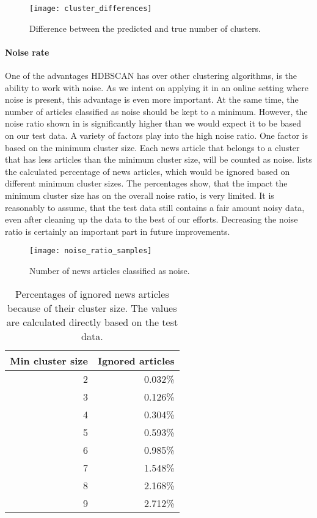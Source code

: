 \begin{figure}[h]
    \centering
    \texttt{[image: cluster\_differences]}
    \caption{Difference between the predicted and true number of clusters.}
    \label{fig:cluster_differences}
\end{figure}

\paragraph{Noise rate}
One of the advantages HDBSCAN has over other clustering algorithms,
is the ability to work with noise.
As we intent on applying it in an online setting where noise is present,
this advantage is even more important.
At the same time, the number of articles classified as noise should be kept to a minimum.
However, the noise ratio shown in  is significantly higher
than we would expect it to be based on our test data.
A variety of factors play into the high noise ratio.
One factor is based on the minimum cluster size.
Each news article that belongs to a cluster that has less articles than the minimum cluster size,
will be counted as noise.
 lists the calculated percentage of news articles,
which would be ignored based on different minimum cluster sizes.
The percentages show, that the impact the minimum cluster size has on the overall noise ratio, is very limited.
It is reasonably to assume, that the test data still contains a fair amount noisy data,
even after cleaning up the data to the best of our efforts.
Decreasing the noise ratio is certainly an important part in future improvements.

\begin{figure}[h]
    \centering
    \texttt{[image: noise\_ratio\_samples]}
    \caption{Number of news articles classified as noise.}
    \label{fig:noise_ratio_samples}
\end{figure}

\begin{table}[h]
    \centering
    \begin{tabular}{|r|r|}
        \hline
        \textbf{Min cluster size} & \textbf{Ignored articles} \\
        \hline
        2 & 0.032\% \\ \hline
        3 & 0.126\% \\ \hline
        4 & 0.304\% \\ \hline
        5 & 0.593\% \\ \hline
        6 & 0.985\% \\ \hline
        7 & 1.548\% \\ \hline
        8 & 2.168\% \\ \hline
        9 & 2.712\% \\ \hline
    \end{tabular}
    \caption{
        Percentages of ignored news articles because of their cluster size.
        The values are calculated directly based on the test data.
    }
    \label{tab:expected_noise}
\end{table}

